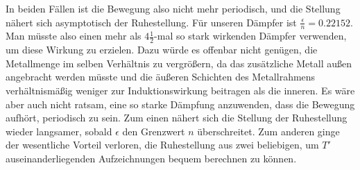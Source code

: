 In beiden Fällen ist die Bewegung also nicht mehr periodisch, und die Stellung nähert sich asymptotisch der Ruhestellung. Für unseren Dämpfer ist $\frac{\epsilon}{n}=0.22152$. Man müsste also einen mehr als $4\tfrac12$-mal so stark wirkenden Dämpfer verwenden, um diese Wirkung zu erzielen. Dazu würde es offenbar nicht genügen, die Metallmenge im selben Verhältnis zu vergrößern, da das zusätzliche Metall außen angebracht werden müsste und die äußeren Schichten des Metallrahmens verhältnismäßig weniger zur Induktionswirkung beitragen als die inneren. Es wäre aber auch nicht ratsam, eine so starke Dämpfung anzuwenden, dass die Bewegung aufhört, periodisch zu sein. Zum einen nähert sich die Stellung der Ruhestellung wieder langsamer, sobald $\epsilon$ den Grenzwert $n$ überschreitet. Zum anderen ginge der wesentliche Vorteil verloren, die Ruhestellung aus zwei beliebigen, um $T'$ auseinanderliegenden Aufzeichnungen bequem berechnen zu können.

